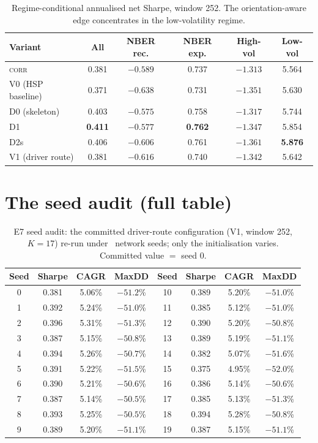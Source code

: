 \begin{table}[h]
  \centering
  \caption{Regime-conditional annualised net Sharpe, window 252. The
    orientation-aware edge concentrates in the low-volatility regime.}
  \label{tab:regime-full}
  \begin{tabular}{l c c c c c}
    \toprule
    Variant & All & NBER rec. & NBER exp. & High-vol & Low-vol \\
    \midrule
    \textsc{corr}     & 0.381 & $-0.589$ & 0.737 & $-1.313$ & 5.564 \\
    V0 (HSP baseline) & 0.371 & $-0.638$ & 0.731 & $-1.351$ & 5.630 \\
    D0 (skeleton)     & 0.403 & $\mathbf{-0.575}$ & 0.758 & $-1.317$ & 5.744 \\
    D1                & \textbf{0.411} & $-0.577$ & \textbf{0.762} & $-1.347$ & 5.854 \\
    D2s               & 0.406 & $-0.606$ & 0.761 & $-1.361$ & \textbf{5.876} \\
    V1 (driver route) & 0.381 & $-0.616$ & 0.740 & $-1.342$ & 5.642 \\
    \bottomrule
  \end{tabular}
\end{table}

\section{The seed audit (full table)}

\begin{table}[h]
  \centering
  \caption{E7 seed audit: the committed driver-route configuration (V1,
    window 252, $K{=}17$) re-run under \rsSeedN\ network seeds; only the
    initialisation varies. Committed value $=$ seed 0.}
  \label{tab:seed-full}
  \begin{tabular}{c c c c | c c c c}
    \toprule
    Seed & Sharpe & CAGR & MaxDD & Seed & Sharpe & CAGR & MaxDD \\
    \midrule
    0 & 0.381 & 5.06\% & $-51.2$\% & 10 & 0.389 & 5.20\% & $-51.0$\% \\
    1 & 0.392 & 5.24\% & $-51.0$\% & 11 & 0.385 & 5.12\% & $-51.0$\% \\
    2 & 0.396 & 5.31\% & $-51.3$\% & 12 & 0.390 & 5.20\% & $-50.8$\% \\
    3 & 0.387 & 5.15\% & $-50.8$\% & 13 & 0.389 & 5.19\% & $-51.1$\% \\
    4 & 0.394 & 5.26\% & $-50.7$\% & 14 & 0.382 & 5.07\% & $-51.6$\% \\
    5 & 0.391 & 5.22\% & $-51.5$\% & 15 & 0.375 & 4.95\% & $-52.0$\% \\
    6 & 0.390 & 5.21\% & $-50.6$\% & 16 & 0.386 & 5.14\% & $-50.6$\% \\
    7 & 0.387 & 5.14\% & $-50.5$\% & 17 & 0.385 & 5.13\% & $-51.3$\% \\
    8 & 0.393 & 5.25\% & $-50.5$\% & 18 & 0.394 & 5.28\% & $-50.8$\% \\
    9 & 0.389 & 5.20\% & $-51.1$\% & 19 & 0.387 & 5.15\% & $-51.1$\% \\
    \bottomrule
  \end{tabular}
\end{table}

